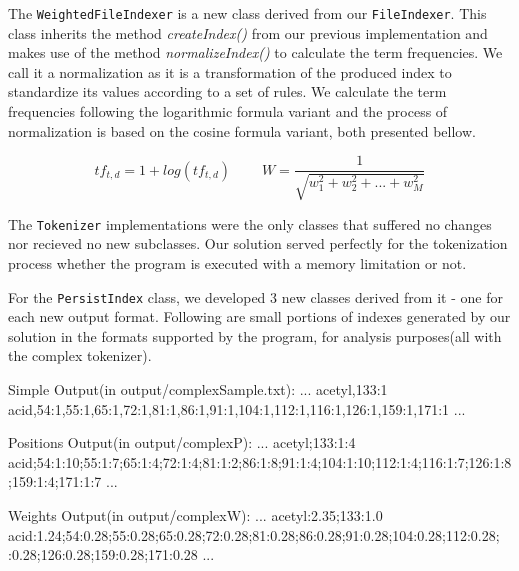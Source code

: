\documentclass[12pt]{article}
\begin{document}
The \texttt{WeightedFileIndexer} is a new class derived from our 
\texttt{FileIndexer}.
This class inherits the method \textit{createIndex()} from our previous 
implementation and makes use of the method \textit{normalizeIndex()} to calculate 
the term frequencies. 
We call it a normalization as it is a transformation of the produced index to
standardize its values according to a set of rules.
We calculate the term frequencies following the logarithmic formula variant and 
the process of normalization is based on the cosine formula variant, both 
presented bellow.

\begin{equation*}
tf_{t,d} = 1 + log(tf_{t,d}) \>\>\>\>\>
\>\>\>\>\> W = \frac{1}{\sqrt{w_1^2 + w_2^2 + ... + w_M^2}}
\end{equation*}

The \texttt{Tokenizer} implementations were the only classes that suffered no
changes nor recieved no new subclasses. 
Our solution served perfectly for the tokenization process whether the program 
is executed with a memory limitation or not.

For the \texttt{PersistIndex} class, we developed 3 new classes derived from 
it - one for each new output format. 
Following are small portions of indexes generated by our solution in the formats
supported by the program, for analysis purposes(all with the complex tokenizer).

Simple Output(in output/complexSample.txt):
\newline ...
\newline acetyl,133:1
\newline acid,54:1,55:1,65:1,72:1,81:1,86:1,91:1,104:1,112:1,116:1,126:1,159:1,171:1
\newline ...
\newline

Positions Output(in output/complexP):
\newline ...
\newline acetyl;133:1:4
\newline acid;54:1:10;55:1:7;65:1:4;72:1:4;81:1:2;86:1:8;91:1:4;104:1:10;112:1:4;116:1:7;126:1:8;159:1:4;171:1:7
\newline ...
\newline

Weights Output(in output/complexW):
\newline ...
\newline acetyl:2.35;133:1.0
\newline acid:1.24;54:0.28;55:0.28;65:0.28;72:0.28;81:0.28;86:0.28;91:0.28;104:0.28;112:0.28;
:0.28;126:0.28;159:0.28;171:0.28
\newline ...
\newline
\end{document}
